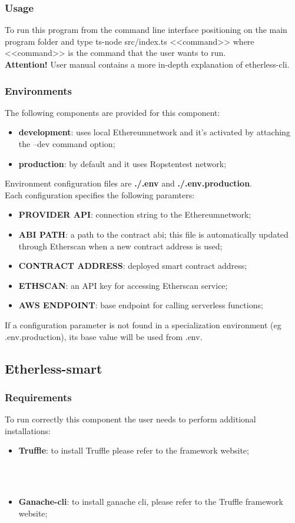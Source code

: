 \subsubsection{Usage}
To run this program from the command line interface positioning on the main program folder
and type ts-node src/index.ts <<command>> where <<command>> is the command that the user wants to run.\\
\textbf{Attention!} User manual contains a more in-depth explanation of etherless-cli.
\subsubsection{Environments}
The following components are provided for this component:
\begin{itemize}
	\item \textbf{development}: uses local Ethereum\glo network and it's activated by attaching the --dev command option;
	\item \textbf{production}: by default and it uses Ropsten\glo test network;
\end{itemize}
Environment configuration files are \textbf{./.env} and \textbf{./.env.production}.
\\Each configuration specifies the following paramters:
\begin{itemize}
	\item \textbf{PROVIDER API}: connection string to the Ethereum\glo network;
	\item \textbf{ABI PATH}: a path to the contract abi; this file is automatically updated through Etherscan when a new contract address is used;
	\item \textbf{CONTRACT ADDRESS}: deployed smart contract address;
	\item \textbf{ETHSCAN}: an API key for accessing Etherscan service;
	\item \textbf{AWS ENDPOINT}: base endpoint for calling serverless functions;
\end{itemize}
If a configuration parameter is not found in a specialization environment (eg .env.production), its base value will be used from .env.
\subsection{Etherless-smart}
\subsubsection{Requirements}
To run correctly this component the user needs to perform additional installations:
\begin{itemize}
    \item \textbf{Truffle}: to install Truffle please refer to the framework website; \\\\\centerline{}\\
    \item \textbf{Ganache-cli}: to install ganache cli, please refer to the Truffle framework website;  \\\\\centerline{}
\end{itemize}

